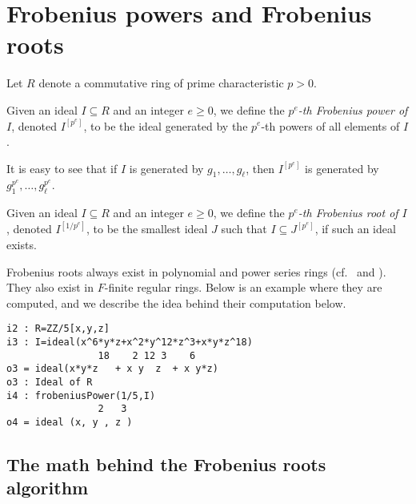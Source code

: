 \documentclass[11pt]{amsart}
\begin{document}
\section{Frobenius powers and Frobenius roots}\label{Section: Frobenius powers and Frobenius roots}

Let $R$ denote a commutative ring of prime characteristic $p>0$.

\begin{definition}
Given an ideal $I\subseteq R$ and an integer $e\geq 0$, we define the \emph{$p^e$-th Frobenius power of $I$}, denoted $I^{[p^e]}$, to be the ideal
generated by the $p^e$-th powers of all elements of $I$.
\end{definition}

It is easy to see that if $I$ is generated by $g_1, \dots, g_\ell$, then $I^{[p^e]}$ is generated by $g_1^{p^e}, \dots, g_\ell^{p^e}$.


\begin{definition}
Given an ideal $I\subseteq R$ and an integer $e\geq 0$, we define the \emph{$p^e$-th Frobenius root of $I$}, denoted $I^{[1/p^{e}]}$, to be the smallest ideal $J$ such that $I\subseteq J^{[p^e]}$, if such an ideal exists.
\end{definition}

Frobenius roots always exist in polynomial and power series rings
(cf.~\cite[\S 2]{BlickleMustataSmithDiscretenessAndRationalityOfFThresholds} and \cite[\S 5]{KatzmanParameterTestIdealOfCMRings}).
They also exist in $F$-finite regular rings.
Below is an example where they are computed, and we describe the idea behind their computation below.%


\begin{verbatim}
i2 : R=ZZ/5[x,y,z]
i3 : I=ideal(x^6*y*z+x^2*y^12*z^3+x*y*z^18)
                18    2 12 3    6
o3 = ideal(x*y*z   + x y  z  + x y*z)
o3 : Ideal of R
i4 : frobeniusPower(1/5,I)
                2   3
o4 = ideal (x, y , z )
\end{verbatim}


\subsection{The math behind the Frobenius roots algorithm}
\end{document}
